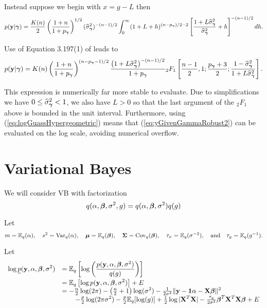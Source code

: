 \documentclass{article}[12pt]
\begin{document}
Instead suppose we begin with $x = g - L$ then
$$
\displaystyle p({\bf y}|{\boldsymbol \gamma})
\displaystyle = \frac{K(n)}{2}\left(\frac{1+n}{1 + p_{\boldsymbol \gamma}}  \right)^{1/2} (\widehat{\sigma}_{\boldsymbol \gamma}^2)^{-(n-1)/2}
\int_0^\infty  (1 + L + h)^{(n - p_{\boldsymbol \gamma})/2 - 2}\left[  \frac{1 + L\widehat{\sigma}_{\boldsymbol \gamma}^2}{\widehat{\sigma}_{\boldsymbol \gamma}^2} + h \right]^{-(n-1)/2} dh.
$$

\noindent Use of Equation 3.197(1) of \cite{Gradshteyn2007} leads to
\begin{equation}\label{eq:yGivenGammaRobust2}
\displaystyle p({\bf y}|{\boldsymbol \gamma})
\displaystyle = K(n) \left( \frac{1 + n}{1 + p_{\boldsymbol \gamma}} \right)^{(n - p_{\boldsymbol \gamma} - 1)/2} \frac{\left( 1 + L\widehat{\sigma}_{\boldsymbol \gamma}^2 \right)^{-(n - 1)/2}}{1 + p_{\boldsymbol \gamma}}
{}_2F_1\left[
\frac{n-1}{2}, 1; \frac{p_{\boldsymbol \gamma}+3}{2}; \frac{1 - \widehat{\sigma}_{\boldsymbol \gamma}^2}{1 + L\widehat{\sigma}_{\boldsymbol \gamma}^2}
\right].
\end{equation}

\noindent This expression is numerically far more stable to evaluate. Due to simplifications
we have $0\le \widehat{\sigma}_{\boldsymbol \gamma}^2<1$, we also have $L>0$ so that the last argument
of the ${}_2F_1$ above is bounded in the unit interval. Furthermore, using
(\ref{eq:logGuassHypergeometric}) means that (\ref{eq:yGivenGammaRobust2}) can be evaluated
on the log scale, avoiding numerical overflow.




\newpage 

\section{Variational Bayes}

\noindent We will consider VB with factorization
$$
q(\alpha,{\boldsymbol \beta},\sigma^2,g) = q(\alpha,{\boldsymbol \beta},\sigma^2) q(g) 
$$

\noindent Let
$$
m = {\mathbb E}_q(\alpha),
\quad 
s^2 = \mbox{Var}_q(\alpha),
\quad 
{\boldsymbol\mu} = {\mathbb E}_q({\boldsymbol \beta}), 
\quad 
{\boldsymbol\Sigma} = \mbox{Cov}_q({\boldsymbol \beta}),
\quad 
\tau_\sigma = {\mathbb E}_q(\sigma^{-2}),
\quad 
\mbox{and}
\quad 
\tau_g = {\mathbb E}_q(g^{-1}).
$$

\noindent Let
$$
\begin{array}{rl}
\displaystyle \log \underline{p}({\bf y},\alpha,{\boldsymbol \beta},\sigma^2) 
& \displaystyle = {\mathbb E}_q\left[ \log\left( \frac{p({\bf y},\alpha,{\boldsymbol \beta},\sigma^2)}{q(g)} \right) \right]
\\ [2ex]
& \displaystyle = {\mathbb E}_q\left[ \log p({\bf y},\alpha,{\boldsymbol \beta},\sigma^2) \right] + E
\\
& \displaystyle = 
- \tfrac{n}{2}\log(2\pi)
- \left( \tfrac{n}{2} + 1 \right) \log(\sigma^2)
- \tfrac{1}{2\sigma^2}\|{\bf y} - {\bf 1}\alpha - {\bf X}{\boldsymbol \beta}\|^2
\\
& \displaystyle \qquad 
- \tfrac{p}{2}\log(2\pi\sigma^2)
- \tfrac{p}{2}{\mathbb E}_q[\log(g)]
+ \tfrac{1}{2}\log|{\bf X}^T{\bf X}|
- \tfrac{\tau_g}{2\sigma^2} {\boldsymbol \beta}^T{\bf X}^T{\bf X}{\boldsymbol \beta} 
 + E
\end{array}
$$
\end{document}
